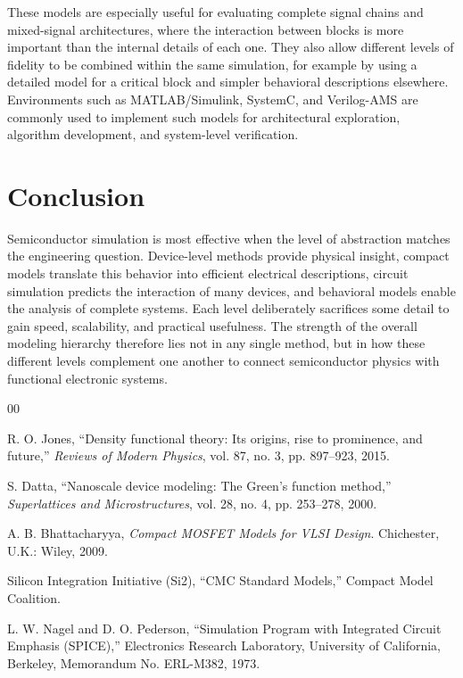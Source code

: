 \documentclass[10pt,a4paper]{article}
\begin{document}
	These models are especially useful for evaluating complete signal chains and mixed-signal architectures, where the interaction between blocks is more important than the internal details of each one. They also allow different levels of fidelity to be combined within the same simulation, for example by using a detailed model for a critical block and simpler behavioral descriptions elsewhere. Environments such as MATLAB/Simulink, SystemC, and Verilog-AMS are commonly used to implement such models for architectural exploration, algorithm development, and system-level verification.
	
	
	\section{Conclusion}
	
	Semiconductor simulation is most effective when the level of abstraction matches the engineering question. Device-level methods provide physical insight, compact models translate this behavior into efficient electrical descriptions, circuit simulation predicts the interaction of many devices, and behavioral models enable the analysis of complete systems. Each level deliberately sacrifices some detail to gain speed, scalability, and practical usefulness. The strength of the overall modeling hierarchy therefore lies not in any single method, but in how these different levels complement one another to connect semiconductor physics with functional electronic systems.
	
	
	\begin{thebibliography}{00}
		
		R. O. Jones,
		``Density functional theory: Its origins, rise to prominence, and future,''
		\emph{Reviews of Modern Physics},
		vol. 87, no. 3, pp. 897--923, 2015.
		
		S. Datta,
		``Nanoscale device modeling: The Green's function method,''
		\emph{Superlattices and Microstructures},
		vol. 28, no. 4, pp. 253--278, 2000.
		
		A. B. Bhattacharyya,
		\emph{Compact MOSFET Models for VLSI Design}.
		Chichester, U.K.: Wiley, 2009.
		
		Silicon Integration Initiative (Si2),
		``CMC Standard Models,''
		Compact Model Coalition.
		
		L. W. Nagel and D. O. Pederson,
		``Simulation Program with Integrated Circuit Emphasis (SPICE),''
		Electronics Research Laboratory, University of California, Berkeley,
		Memorandum No. ERL-M382, 1973.
		
	\end{thebibliography}
	
\end{document}
